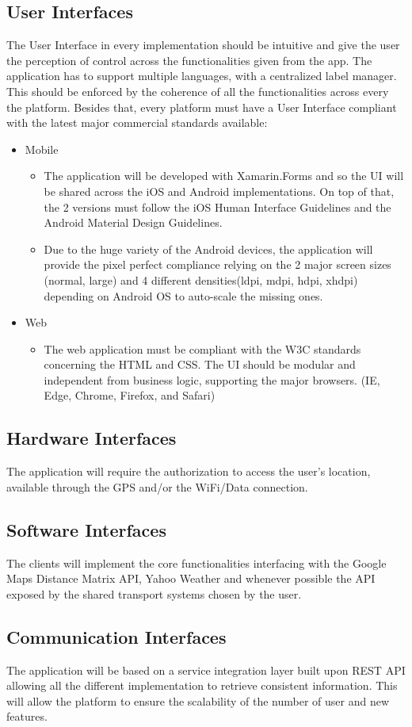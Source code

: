 \subsection{User Interfaces}

The User Interface in every implementation should be intuitive and give the user the perception of control across the functionalities given from the app. 
The application has to support multiple languages, with a centralized label manager.
This should be enforced by the coherence of all the functionalities across every the platform.
Besides that, every platform must have a User Interface compliant with the latest major commercial standards available:
\begin{itemize}
\item Mobile
\begin{itemize}
\item The application will be developed with Xamarin.Forms and so the UI will be shared across the iOS and Android implementations. On top of that, the 2 versions must follow the iOS Human Interface Guidelines and the Android Material Design Guidelines.
\item Due to the huge variety of the Android devices, the application will provide the pixel perfect compliance relying on the 2 major screen sizes (normal, large) and 4 different densities(ldpi, mdpi, hdpi, xhdpi) depending on Android OS to auto-scale the missing ones.
\end{itemize}

\item Web
\begin{itemize}
\item The web application must be compliant with the W3C standards concerning the HTML and CSS. The UI should be modular and independent from business logic, supporting the major browsers. (IE, Edge, Chrome, Firefox, and Safari)
\end{itemize}
\end{itemize}

\subsection{Hardware Interfaces}
The application will require the authorization to access the user’s location, available through the GPS and/or the WiFi/Data connection. 

\subsection{Software Interfaces}
The clients will implement the core functionalities interfacing with the Google Maps Distance Matrix API, Yahoo Weather and whenever possible the API exposed by the shared transport systems chosen by the user. 

\subsection{Communication Interfaces}
The application will be based on a service integration layer built upon REST API allowing all the different implementation to retrieve consistent information. 
This will allow the platform to ensure the scalability of the number of user and new features.